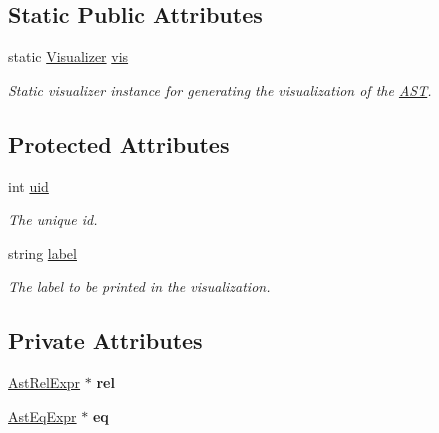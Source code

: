 \subsection*{Static Public Attributes}
\begin{DoxyCompactItemize}
\item 
\hypertarget{classAST_aca9e6637209b31e03a09c0d42f29bdfa}{static \hyperlink{classVisualizer}{Visualizer} \hyperlink{classAST_aca9e6637209b31e03a09c0d42f29bdfa}{vis}}\label{classAST_aca9e6637209b31e03a09c0d42f29bdfa}

\begin{DoxyCompactList}\small\item\em Static visualizer instance for generating the visualization of the \hyperlink{classAST}{A\-S\-T}. \end{DoxyCompactList}\end{DoxyCompactItemize}
\subsection*{Protected Attributes}
\begin{DoxyCompactItemize}
\item 
\hypertarget{classAST_a847b778f1c3dd5a19de32de432ee6e15}{int \hyperlink{classAST_a847b778f1c3dd5a19de32de432ee6e15}{uid}}\label{classAST_a847b778f1c3dd5a19de32de432ee6e15}

\begin{DoxyCompactList}\small\item\em The unique id. \end{DoxyCompactList}\item 
\hypertarget{classAST_ab2e239ccc0688d2341724432ff5a1a31}{string \hyperlink{classAST_ab2e239ccc0688d2341724432ff5a1a31}{label}}\label{classAST_ab2e239ccc0688d2341724432ff5a1a31}

\begin{DoxyCompactList}\small\item\em The label to be printed in the visualization. \end{DoxyCompactList}\end{DoxyCompactItemize}
\subsection*{Private Attributes}
\begin{DoxyCompactItemize}
\item 
\hypertarget{classAstEqExpr_a401f58facf1b9d58e6a6eb1cdb3cb38d}{\hyperlink{classAstRelExpr}{Ast\-Rel\-Expr} $\ast$ {\bfseries rel}}\label{classAstEqExpr_a401f58facf1b9d58e6a6eb1cdb3cb38d}

\item 
\hypertarget{classAstEqExpr_a66192b3d4a06af9796d6d34aa89bb8c7}{\hyperlink{classAstEqExpr}{Ast\-Eq\-Expr} $\ast$ {\bfseries eq}}\label{classAstEqExpr_a66192b3d4a06af9796d6d34aa89bb8c7}

\end{DoxyCompactItemize}


